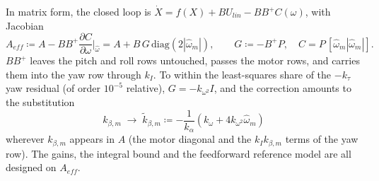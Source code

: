 \documentclass{article}
\begin{document}
In matrix form, the closed loop is $\dot{X} = f(X) + BU_{lin} - BB^+C(\omega)$, with Jacobian
\begin{equation}
    A_{eff} \coloneqq A - BB^+\frac{\partial C}{\partial \omega}\bigg|_{\widehat{\omega}}
    = A + B\,G\,\mathrm{diag}\left(2|\widehat{\omega}_m|\right),
    \qquad G \coloneqq -B^+ P,\quad C = P\,[\widehat{\omega}_m|\widehat{\omega}_m|].
\end{equation}
$BB^+$ leaves the pitch and roll rows untouched, passes the motor rows, and carries them into the yaw row through $k_I$.  To within the least-squares share of the $-k_\tau$ yaw residual (of order $10^{-5}$ relative), $G = -k_{\omega^2}I$, and the correction amounts to the substitution
\begin{equation}
    k_{\beta, m} \;\to\; \tilde{k}_{\beta, m} \coloneqq -\frac{1}{k_\alpha}\left(k_\omega + 4 k_{\omega^2}\widehat{\omega}_m\right)
\end{equation}
wherever $k_{\beta, m}$ appears in $A$ (the motor diagonal and the $k_I k_{\beta, m}$ terms of the yaw row).  The gains, the integral bound and the feedforward reference model are all designed on $A_{eff}$.
\end{document}
